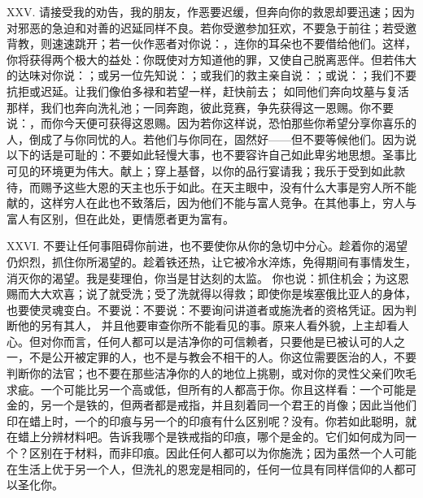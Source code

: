 XXV. 请接受我的劝告，我的朋友，作恶要迟缓，但奔向你的救恩却要迅速；因为对邪恶的急迫和对善的迟延同样不良。若你受邀参加狂欢，不要急于前往；若受邀背教，则速速跳开；若一伙作恶者对你说：，连你的耳朵也不要借给他们。这样，你将获得两个极大的益处：你既使对方知道他的罪，又使自己脱离恶伴。但若伟大的达味对你说：；或另一位先知说：；或我们的救主亲自说：；或说：；我们不要抗拒或迟延。让我们像伯多禄和若望一样，赶快前去； 如同他们奔向坟墓与复活那样，我们也奔向洗礼池；一同奔跑，彼此竞赛，争先获得这一恩赐。你不要说：，而你今天便可获得这恩赐。因为若你这样说，恐怕那些你希望分享你喜乐的人，倒成了与你同忧的人。若他们与你同在，固然好——但不要等候他们。因为说以下的话是可耻的：不要如此轻慢大事，也不要容许自己如此卑劣地思想。圣事比可见的环境更为伟大。献上；穿上基督，以你的品行宴请我；我乐于受到如此款待，而赐予这些大恩的天主也乐于如此。在天主眼中，没有什么大事是穷人所不能献的，这样穷人在此也不致落后，因为他们不能与富人竞争。在其他事上，穷人与富人有区别，但在此处，更情愿者更为富有。\par

XXVI. 不要让任何事阻碍你前进，也不要使你从你的急切中分心。趁着你的渴望仍炽烈，抓住你所渴望的。趁着铁还热，让它被冷水淬炼，免得期间有事情发生，消灭你的渴望。我是斐理伯，你当是甘达刻的太监。 你也说：抓住机会；为这恩赐而大大欢喜；说了就受洗；受了洗就得以得救；即使你是埃塞俄比亚人的身体，也要使灵魂变白。不要说：不要说：不要询问讲道者或施洗者的资格凭证。因为判断他的另有其人， 并且他要审查你所不能看见的事。原来人看外貌，上主却看人心。但对你而言，任何人都可以是洁净你的可信赖者，只要他是已被认可的人之一，不是公开被定罪的人，也不是与教会不相干的人。你这位需要医治的人，不要判断你的法官；也不要在那些洁净你的人的地位上挑剔，或对你的灵性父亲们吹毛求疵。一个可能比另一个高或低，但所有的人都高于你。你且这样看：一个可能是金的，另一个是铁的，但两者都是戒指，并且刻着同一个君王的肖像；因此当他们印在蜡上时，一个的印痕与另一个的印痕有什么区别呢？没有。你若如此聪明，就在蜡上分辨材料吧。告诉我哪个是铁戒指的印痕，哪个是金的。它们如何成为同一个？区别在于材料，而非印痕。因此任何人都可以为你施洗；因为虽然一个人可能在生活上优于另一个人，但洗礼的恩宠是相同的，任何一位具有同样信仰的人都可以圣化你。\par

